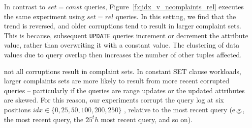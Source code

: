 In contrast to $set=const$ queries, Figure~\ref{f:qidx_v_ncomplaints_rel} executes the 
same experiment using $set=rel$ queries.  In this setting, we find that the trend is
reversed, and older corruptions tend to result in larger complaint sets.  This is because,
subsequent \texttt{UPDATE} queries increment or decrement the attribute value, rather than
overwriting it with a constant value.  The clustering of data values due to query overlap
then increases the number of other tuples affected.


not all corruptions result in complaint sets.
In constant SET clause workloads, larger complaints sets are more likely to
result from more recent corrupted queries -- particularly if the queries are range updates or
the updated attributes are skewed.
For this reason, our experiments corrupt the query log at six positions 
$idx \in \{0, 25, 50, 100, 200, 250\}$ , relative 
to the most recent query (e.g., the most recent query, the $25^th$ most recent query, and so on).





